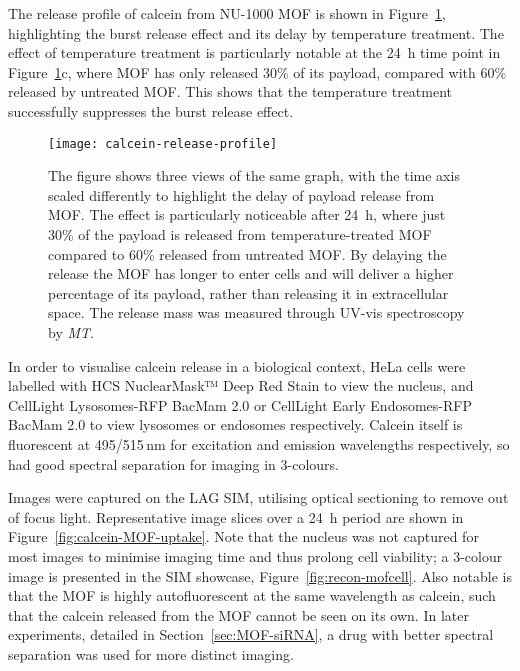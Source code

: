 The release profile of calcein from NU-1000 MOF is shown in Figure~\ref{fig:calcein-release-profile}, highlighting the burst release effect and its delay by temperature treatment.
The effect of temperature treatment is particularly notable at the \SI{24}{\hour} time point in Figure~\ref{fig:calcein-release-profile}c, where MOF has only released 30\% of its payload, compared with 60\% released by untreated MOF.
This shows that the temperature treatment successfully suppresses the burst release effect.

\begin{figure}[htbp!]
\centering
\texttt{[image: calcein-release-profile]}
\caption[MOFs: Payload release is delayed by temperature treatment]{ The figure shows three views of the same graph, with the time axis scaled differently to highlight the delay of payload release from MOF. The effect is particularly noticeable after \SI{24}{\hour}, where just 30\% of the payload is released from temperature-treated MOF compared to 60\% released from untreated MOF. By delaying the release the MOF has longer to enter cells and will deliver a higher percentage of its payload, rather than releasing it in extracellular space. The release mass was measured through UV-vis spectroscopy by \textit{MT}. }
\label{fig:calcein-release-profile}
\end{figure}

In order to visualise calcein release in a biological context, HeLa cells were labelled with HCS NuclearMask™ Deep Red Stain to view the nucleus, and CellLight Lysosomes-RFP BacMam 2.0 or CellLight Early Endosomes-RFP BacMam 2.0 to view lysosomes or endosomes respectively.
Calcein itself is fluorescent at 495/515\,\si{\nano\meter} for excitation and emission wavelengths respectively, so had good spectral separation for imaging in 3-colours. %

Images were captured on the LAG SIM, utilising optical sectioning to remove out of focus light.
Representative image slices over a \SI{24}{\hour} period are shown in Figure~\ref{fig:calcein-MOF-uptake}.
Note that the nucleus was not captured for most images to minimise imaging time and thus prolong cell viability; a 3-colour image is presented in the SIM showcase, Figure~\ref{fig:recon-mofcell}.
Also notable is that the MOF is highly autofluorescent at the same wavelength as calcein, such that the calcein released from the MOF cannot be seen on its own.
In later experiments, detailed in Section~\ref{sec:MOF-siRNA}, a drug with better spectral separation was used for more distinct imaging.

